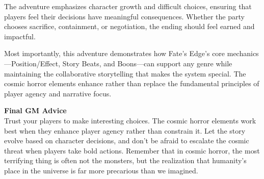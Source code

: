 \documentclass[12pt,twoside]{article}
\newenvironment{adventurebox}[1]{%
  \begin{shaded}%
  \textbf{\large #1}\\%
}{\end{shaded}}
\begin{document}
The adventure emphasizes character growth and difficult choices, ensuring that players feel their decisions have meaningful consequences. Whether the party chooses sacrifice, containment, or negotiation, the ending should feel earned and impactful.

Most importantly, this adventure demonstrates how Fate's Edge's core mechanics---Position/Effect, Story Beats, and Boons---can support any genre while maintaining the collaborative storytelling that makes the system special. The cosmic horror elements enhance rather than replace the fundamental principles of player agency and narrative focus.

\begin{adventurebox}{Final GM Advice}
Trust your players to make interesting choices. The cosmic horror elements work best when they enhance player agency rather than constrain it. Let the story evolve based on character decisions, and don't be afraid to escalate the cosmic threat when players take bold actions. Remember that in cosmic horror, the most terrifying thing is often not the monsters, but the realization that humanity's place in the universe is far more precarious than we imagined.
\end{adventurebox}
\end{document}

